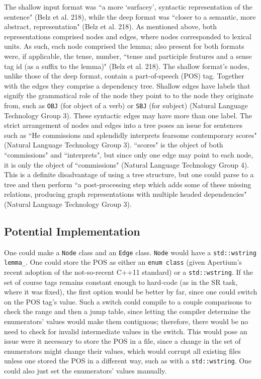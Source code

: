 \documentclass[12pt,letterpaper]{article}
\begin{document}
\begin{flushleft}
  The shallow input format was ``a more `surfacey', syntactic representation of the sentence" (Belz et al. 218), while the deep format was ``closer to a semantic, more abstract, representation" (Belz et al. 218). As mentioned above, both representations comprised nodes and edges, where nodes corresponded to lexical units. As such, each node comprised the lemma; also present for both formats were, if applicable, the tense, number, ``tense and participle features and a sense tag id (as a suffix to the lemma)" (Belz et al. 218). %
  The shallow format's nodes, unlike those of the deep format, contain a part-of-speech (POS) tag. Together with the edges they comprise a dependency tree. Shallow edges have labels that signify the grammatical role of the node they point to to the node they originate from, such as \texttt{OBJ} (for object of a verb) or \texttt{SBJ} (for subject) (Natural Language Technology Group 3). These syntactic edges may have more than one label. The strict arrangement of nodes and edges into a tree poses an issue for sentences such as ``He commissions and splendidly interprets fearsome contemporary scores" (Natural Language Technology Group 3). ``scores" is the object of both ``commissions" and ``interprets", but since only one edge may point to each node, it is only the object of ``commissions" (Natural Language Technology Group 4). This is a definite disadvantage of using a tree structure, but one could parse to a tree and then perform ``a post-processing step which adds some of these missing relations, producing graph representations with multiple headed dependencies" (Natural Language Technology Group 3).
  \subsection*{Potential Implementation} One could make a \texttt{Node} class and an \texttt{Edge} class. \texttt{Node} would have a \texttt{std::wstring lemma\_}. One could store the POS as either an \texttt{enum class} (given Apertium's recent adoption of the not-so-recent C++11 standard) or a \texttt{std::wstring}. If the set of course tags remains constant enough to hard-code (as in the SR task, where it was fixed), the first option would be better by far, since one could switch on the POS tag's value. Such a switch could compile to a couple comparisons to check the range and then a jump table, since letting the compiler determine the enumerators' values would make them contiguous; therefore, there would be no need to check for invalid intermediate values in the switch. This would pose an issue were it necessary to store the POS in a file, since a change in the set of enumerators might change their values, which would corrupt all existing files unless one stored the POS in a different way, such as with a \texttt{std::wstring}. One could also just set the enumerators' values manually.


\end{flushleft}
\end{document}
